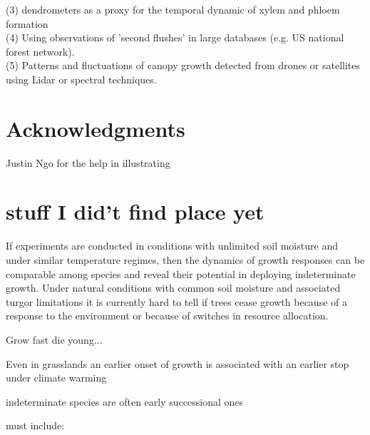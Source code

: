 \documentclass{article}
\begin{document}
	(3) dendrometers as a proxy for the temporal dynamic of xylem and phloem formation \\
	
	(4) Using observations of 'second flushes' in large databases (e.g. US national forest network). \\
	
	(5) Patterns and fluctuations of canopy growth detected from drones or satellites using Lidar or spectral techniques.
	

	

	
\section*{Acknowledgments}
	Justin Ngo for the help in illustrating
	


	
	

	
	\pagebreak
	

	\newpage
\section*{stuff I did't find place yet}

	
If experiments are conducted in conditions with unlimited soil moisture and under similar temperature regimes, then the dynamics of growth responses can be comparable among species and reveal their potential in deploying indeterminate growth. Under natural conditions with common soil moisture and associated turgor limitations it is currently hard to tell if trees cease growth because of a response to the environment or because of switches in resource allocation. 

 Grow fast die young...
 
 Even in grasslands an earlier onset of growth is associated with an earlier stop under climate warming \cite{mohlGrowthAlpineGrassland2022a}
	
indeterminate species are often early successional ones \citep{marksRelationExtensionGrowth1975, boojhGrowthStrategyTrees1982}

	
	must include: \cite{iwasaOptimalGrowthSchedule1989}
	\newpage
	
	
	
	
	
	
\end{document}
